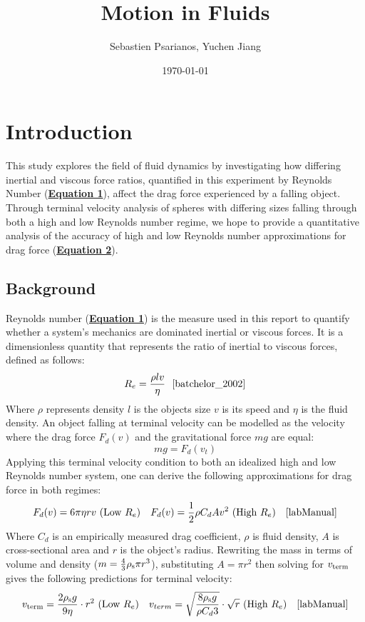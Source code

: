 \documentclass[
	letterpaper
	12pt
]{template}
\newcommand{\bref}[2]{\textbf{\hyperref[#1]{#2}}}
\begin{document}
\title{Motion in Fluids}

\author{Sebastien Psarianos, Yuchen Jiang}

\date{\today}
\maketitle
\section{Introduction}
This study explores the field of fluid dynamics by investigating how differing inertial and viscous force ratios, quantified in this experiment by Reynolds Number (\bref{eqn::reynolds}{Equation 1}), affect the drag force experienced by a falling object. Through terminal velocity analysis of spheres with differing sizes falling through both a high and low Reynolds number regime, we hope to provide a quantitative analysis of the accuracy of high and low Reynolds number approximations for drag force (\bref{eqn::dragForce}{Equation 2}).

\subsection{Background}
Reynolds number (\bref{reynolds}{Equation 1}) is the measure used in this report to quantify whether a system's mechanics are dominated inertial or viscous forces. It is a dimensionless quantity that represents the ratio of inertial to viscous forces, defined as follows:
\begin{equation}\label{eqn::reynolds}
	R_e = \frac{\rho l v}{\eta}\ \ \text{\cite{batchelor_2002}}
\end{equation}
Where $\rho$ represents density $l$ is the objects size $v$ is its speed and $\eta$ is the fluid density. An object falling at terminal velocity can be modelled as the velocity where the drag force $F_d(v)$ and the gravitational force $mg$ are equal:
\[mg = F_d(v_{t})\]
Applying this terminal velocity condition to both an idealized high and low Reynolds number system, one can derive the following approximations for drag force in both regimes:
\begin{align}\label{eqn::dragForce}
	F_d(v) = 6\pi\eta r v \text{ (Low $R_e$)} && F_d(v) = {1\over 2}\rho C_dAv^2 \text{ (High $R_e$)} && \cite{labManual}
\end{align}
Where $C_d$ is an empirically measured drag coefficient, $\rho$ is fluid density, $A$ is cross-sectional area and $r$ is the object's radius. Rewriting the mass in terms of volume and density ($m =  {4\over 3}\rho_{\rm s}\pi r^3$), substituting $A=\pi r^2$ then solving for $v_{\rm term}$ gives the following predictions for terminal velocity:
\begin{align}\label{eqn::terminalVelocity}
	v_{\rm term}  = {2\rho_{\rm s} g\over 9 \eta}\cdot r^2 \text{ (Low $R_e$)} && 	v_{term} =\sqrt{8\rho_{\rm s} g\over \rho C_d  3}\cdot \sqrt{r} \text{ (High $R_e$)}
	&& \cite{labManual}
\end{align}
\end{document}
